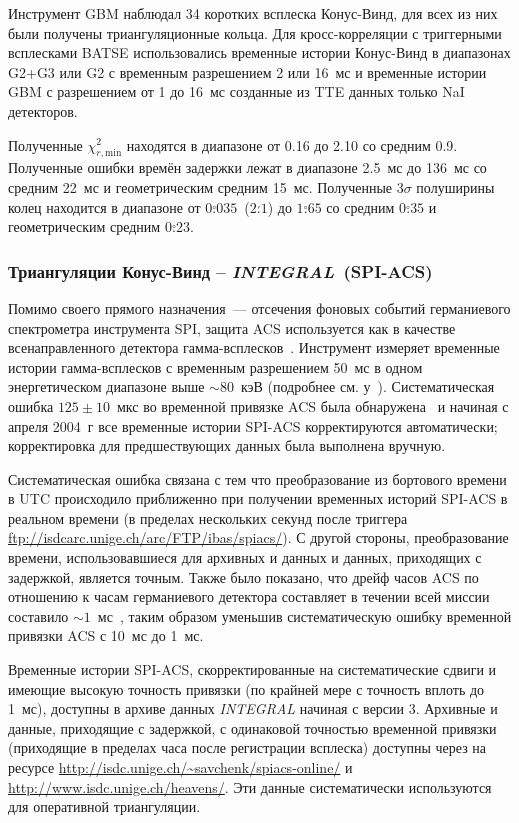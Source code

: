Инструмент GBM наблюдал 34 коротких всплеска Конус-Винд, для всех из них были 
получены триангуляционные кольца. Для кросс-корреляции с триггерными всплесками 
BATSE использовались временные истории Конус-Винд в диапазонах G2+G3 или G2 с 
временным разрешением 2 или 16~мс и временные истории GBM с разрешением от 1 до 
16~мс созданные из TTE данных только NaI детекторов.

Полученные $\chi^2_{r,\textrm{min}}$ находятся в диапазоне от 0.16 до 2.10 со средним 0.9. 
Полученные ошибки времён задержки лежат в диапазоне 2.5~мс до 136~мс со средним 22~мс и 
геометрическим средним 15~мс. Полученные $3\sigma$ полуширины  колец находится в 
диапазоне от $0\overset{\circ}{.}035$~($2\overset{\prime}{.}1$) до $1\overset{\circ}{.}65$ 
со средним $0\overset{\circ}{.}35$ и геометрическим средним $0\overset{\circ}{.}23$.

\subsubsection{Триангуляции Конус-Винд -- \textit{INTEGRAL}~(SPI-ACS)}
Помимо своего прямого назначения~--- отсечения фоновых событий германиевого 
спектрометра инструмента SPI, защита ACS используется как в качестве всенаправленного 
детектора гамма-всплесков~\citep{von_Kienlin_2003AA}. Инструмент измеряет временные 
истории гамма-всплесков с временным разрешением 50~мс в одном энергетическом 
диапазоне выше $\sim 80$~кэВ (подробнее см. у~\citealt{Lichti_2000AIPC}). 
Систематическая ошибка $125\pm10$~мкс во временной привязке ACS была обнаружена~\citep{Rau_2004GCN} 
и начиная с апреля 2004~г все временные истории SPI-ACS корректируются автоматически; 
корректировка для предшествующих данных была выполнена вручную.

Систематическая ошибка связана с тем что преобразование из бортового времени в UTC 
происходило приближенно при получении временных историй SPI-ACS в реальном времени 
(в пределах нескольких секунд после триггера \url{ftp://isdcarc.unige.ch/arc/FTP/ibas/spiacs/}). 
С другой стороны, преобразование времени, использовавшиеся для архивных и данных и данных, 
приходящих с задержкой, является точным. Также было показано, что дрейф часов ACS 
по отношению к часам германиевого детектора составляет в течении всей миссии 
составило $\sim 1$~мс~\citep{Zhang_2010int}, таким образом уменьшив систематическую 
ошибку временной привязки ACS с 10~мс до 1~мс.

Временные истории SPI-ACS, скорректированные на систематические сдвиги и имеющие 
высокую точность привязки (по крайней мере с точность вплоть до 1~мс), доступны 
в архиве данных \textit{INTEGRAL} начиная с версии 3. Архивные и данные, приходящие 
с задержкой, с одинаковой точностью временной привязки (приходящие в пределах 
часа после регистрации всплеска) доступны через на ресурсе 
\url{http://isdc.unige.ch/~savchenk/spiacs-online/} и 
\url{http://www.isdc.unige.ch/heavens/}. Эти данные систематически используются для оперативной триангуляции.

